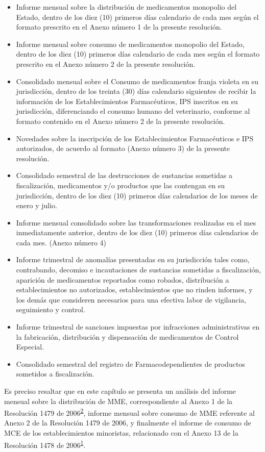 \documentclass[
  oneside]{book}
\begin{document}
\begin{itemize}
\item
  Informe mensual sobre la distribución de medicamentos monopolio del Estado, dentro de los diez (10) primeros días calendario de cada mes según el formato prescrito en el Anexo número 1 de la presente resolución.
\item
  Informe mensual sobre consumo de medicamentos monopolio del Estado, dentro de los diez (10) primeros días calendario de cada mes según el formato prescrito en el Anexo número 2 de la presente resolución.
\item
  Consolidado mensual sobre el Consumo de medicamentos franja violeta en su jurisdicción, dentro de los treinta (30) días calendario siguientes de recibir la información de los Establecimientos Farmacéuticos, IPS inscritos en su jurisdicción, diferenciando el consumo humano del veterinario, conforme al formato contenido en el Anexo número 2 de la presente resolución.
\item
  Novedades sobre la inscripción de los Establecimientos Farmacéuticos e IPS autorizados, de acuerdo al formato (Anexo número 3) de la presente resolución.
\item
  Consolidado semestral de las destrucciones de sustancias sometidas a fiscalización, medicamentos y/o productos que las contengan en su jurisdicción, dentro de los diez (10) primeros días calendarios de los meses de enero y julio.
\item
  Informe mensual consolidado sobre las transformaciones realizadas en el mes inmediatamente anterior, dentro de los diez (10) primeros días calendarios de cada mes. (Anexo número 4)
\item
  Informe trimestral de anomalías presentadas en su jurisdicción tales como, contrabando, decomiso e incautaciones de sustancias sometidas a fiscalización, aparición de medicamentos reportados como robados, distribución a establecimientos no autorizados, establecimientos que no rinden informes, y los demás que consideren necesarios para una efectiva labor de vigilancia, seguimiento y control.
\item
  Informe trimestral de sanciones impuestas por infracciones administrativas en la fabricación, distribución y dispensación de medicamentos de Control Especial.
\item
  Consolidado semestral del registro de Farmacodependientes de productos sometidos a fiscalización.
\end{itemize}

Es preciso resaltar que en este capítulo se presenta un análisis del informe mensual sobre la distribución de MME, correspondiente al Anexo 1 de la Resolución 1479 de 2006\textsuperscript{\protect\hyperlink{ref-MSPS1479-2006}{2}}, informe mensual sobre consumo de MME referente al Anexo 2 de la Resolución 1479 de 2006, y finalmente el informe de consumo de MCE de los establecimientos minoristas, relacionado con el Anexo 13 de la Resolución 1478 de 2006\textsuperscript{\protect\hyperlink{ref-MSPS1478-2006}{1}}.
\end{document}

